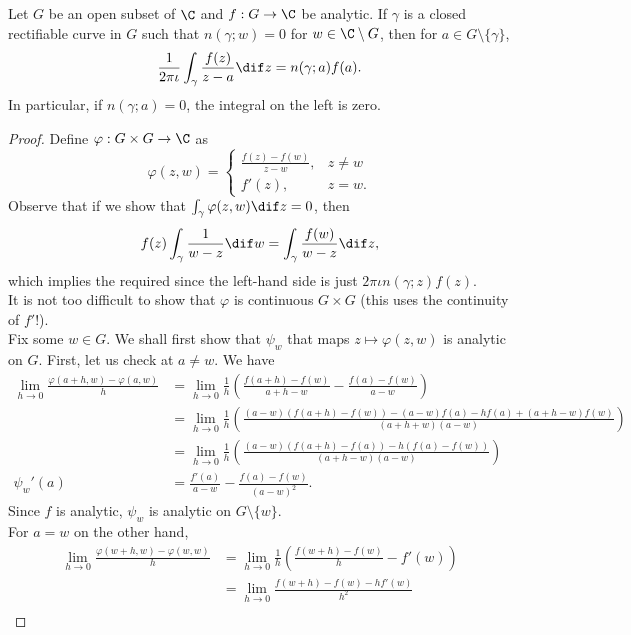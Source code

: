 		\begin{ftheo}
			\label{cauchy integral formula v1}
			Let $G$ be an open subset of $\C$ and $f : G \to \C$ be analytic. If $\gamma$ is a closed rectifiable curve in $G$ such that $n(\gamma;w) = 0$ for $w \in \C\setminus G$, then for $a \in G\setminus\{\gamma\}$,
			\[ \frac{1}{2\pi\iota} \int_\gamma \frac{f(z)}{z-a} \dif z = n(\gamma;a) f(a). \]
			In particular, if $n(\gamma;a) = 0$, the integral on the left is zero.
		\end{ftheo}
		\begin{proof}
			Define $\varphi : G \times G \to \C$ as
			\[ \varphi(z,w) =
				\begin{cases}
					\frac{f(z) - f(w)}{z-w}, & z\ne w \\
					f'(z), & z=w.
				\end{cases}
			\]
			Observe that if we show that $\int_\gamma \varphi(z,w) \dif z = 0$, then
			\[ f(z) \int_\gamma \frac{1}{w-z} \dif w = \int_\gamma \frac{f(w)}{w-z} \dif z, \]
			which implies the required since the left-hand side is just $2\pi\iota n(\gamma;z) f(z)$.\\
			It is not too difficult to show that $\varphi$ is continuous $G\times G$ (this uses the continuity of $f'$!).\\
			Fix some $w \in G$. We shall first show that $\psi_w$ that maps $z \mapsto \varphi(z,w)$ is analytic on $G$. First, let us check at $a \ne w$. We have
			\begin{align*}
			 	\lim_{h\to 0} \frac{\varphi(a+h,w) - \varphi(a,w)}{h} &= \lim_{h\to 0} \frac{1}{h} \left( \frac{f(a+h) - f(w)}{a+h-w} - \frac{f(a) - f(w)}{a-w} \right) \\
			 		&= \lim_{h \to 0} \frac{1}{h} \left( \frac{(a-w) (f(a+h) - f(w)) - (a-w) f(a) - hf(a) + (a+h-w)f(w)}{(a+h+w)(a-w)} \right) \\
			 		&= \lim_{h \to 0} \frac{1}{h} \left( \frac{(a-w)(f(a+h)-f(a)) - h(f(a)-f(w))}{(a+h-w)(a-w)} \right) \\
			 	\psi_w'(a) &= \frac{f'(a)}{a-w} - \frac{f(a)-f(w)}{(a-w)^2}.
			\end{align*} 
			Since $f$ is analytic, $\psi_w$ is analytic on $G \setminus \{w\}$.\\
			For $a=w$ on the other hand,
			\begin{align}
				\lim_{h\to 0} \frac{\varphi(w+h,w) - \varphi(w,w)}{h} &= \lim_{h\to 0} \frac{1}{h} \left( \frac{f(w+h) - f(w)}{h} - f'(w) \right) \nonumber \\
					&= \lim_{h\to 0} \frac{f(w+h) - f(w) - hf'(w)}{h^2} \label{eqn: 2.8} \\

\end{align}
\end{proof}
